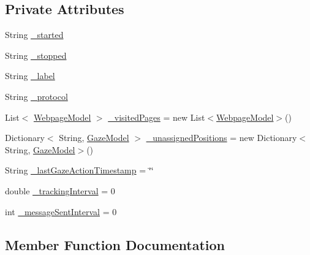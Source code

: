\subsection*{Private Attributes}
\begin{DoxyCompactItemize}
\item 
String \hyperlink{class_web_analyzer_1_1_models_1_1_data_model_1_1_test_model_a81e009853a2999fac79631cfcd0ed4db}{\+\_\+started}
\item 
String \hyperlink{class_web_analyzer_1_1_models_1_1_data_model_1_1_test_model_a6253cabd7bb33c13da5927853cc8d228}{\+\_\+stopped}
\item 
String \hyperlink{class_web_analyzer_1_1_models_1_1_data_model_1_1_test_model_a00ce1716b13b35172fb8ac3498d6f04b}{\+\_\+label}
\item 
String \hyperlink{class_web_analyzer_1_1_models_1_1_data_model_1_1_test_model_ac85ac6bfbbd03a3e1860822a74ce8649}{\+\_\+protocol}
\item 
List$<$ \hyperlink{class_web_analyzer_1_1_models_1_1_data_model_1_1_webpage_model}{Webpage\+Model} $>$ \hyperlink{class_web_analyzer_1_1_models_1_1_data_model_1_1_test_model_a849d23a83d37ac0e965c3946d8085aa2}{\+\_\+visited\+Pages} = new List$<$\hyperlink{class_web_analyzer_1_1_models_1_1_data_model_1_1_webpage_model}{Webpage\+Model}$>$()
\item 
Dictionary$<$ String, \hyperlink{class_web_analyzer_1_1_models_1_1_data_model_1_1_gaze_model}{Gaze\+Model} $>$ \hyperlink{class_web_analyzer_1_1_models_1_1_data_model_1_1_test_model_a1eaf774e73692913671ff3cb85f5772e}{\+\_\+unassigned\+Positions} = new Dictionary$<$String, \hyperlink{class_web_analyzer_1_1_models_1_1_data_model_1_1_gaze_model}{Gaze\+Model}$>$()
\item 
String \hyperlink{class_web_analyzer_1_1_models_1_1_data_model_1_1_test_model_a9969004441000c661fe533b8d954ec54}{\+\_\+last\+Gaze\+Action\+Timestamp} = \char`\"{}\char`\"{}
\item 
double \hyperlink{class_web_analyzer_1_1_models_1_1_data_model_1_1_test_model_a7f6665a0e91e4a550aed5bf34765a990}{\+\_\+tracking\+Interval} = 0
\item 
int \hyperlink{class_web_analyzer_1_1_models_1_1_data_model_1_1_test_model_a7ef435f4317bf383688e0d6c672581d4}{\+\_\+message\+Sent\+Interval} = 0
\end{DoxyCompactItemize}


\subsection{Member Function Documentation}
\hypertarget{class_web_analyzer_1_1_models_1_1_data_model_1_1_test_model_ad58dc0c0e38b5663113167469c248796}{}
